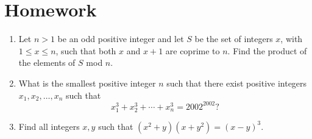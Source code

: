 \documentclass{article}
\begin{document}
\section{Homework}
\begin{enumerate}
  \item Let $n>1$ be an odd positive integer and let $S$ be the set of integers
    $x$, with $1\le x\le n$, such that both $x$ and $x+1$ are coprime to $n$.
    Find the product of the elements of $S$ mod $n$.
  \item What is the smallest positive integer $n$ such that there exist positive
    integers $x_1,x_2,\ldots,x_n$ such that
    \[x_1^3+x_2^3+\cdots+x_n^3=2002^{2002}?\]
  \item Find all integers $x,y$ such that $(x^2+y)(x+y^2)=(x-y)^3$.
\end{enumerate}
\end{document}
